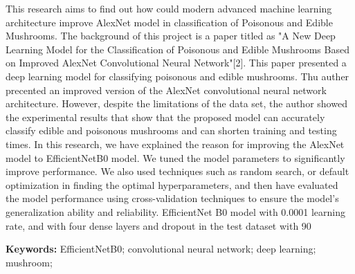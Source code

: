  This research aims to find out how could modern advanced machine learning architecture improve AlexNet model in classification of Poisonous and Edible Mushrooms. The background of this project is a paper titled as "A New Deep Learning Model for the Classification of Poisonous and Edible Mushrooms Based on Improved AlexNet Convolutional Neural Network"[2]. This paper presented a deep learning model for classifying poisonous and edible mushrooms. Thu auther precented an improved version of the AlexNet convolutional neural network architecture. However, despite the limitations of the data set, the author showed the experimental results that show that the proposed model can accurately classify edible and poisonous mushrooms and can shorten training and testing times. In this research, we have explained the reason for improving the AlexNet model to EfficientNetB0 model. We tuned the model parameters to significantly improve performance. We also used techniques such as random search, or default optimization in finding the optimal hyperparameters, and then have evaluated the model performance using cross-validation techniques to ensure the model's generalization ability and reliability. EfficientNet B0 model with 0.0001 learning rate, and with four dense layers and dropout in the test dataset with 90%
\hfill \break

\textbf{Keywords:} 
EfficientNetB0; convolutional neural network; deep learning; mushroom;
 
